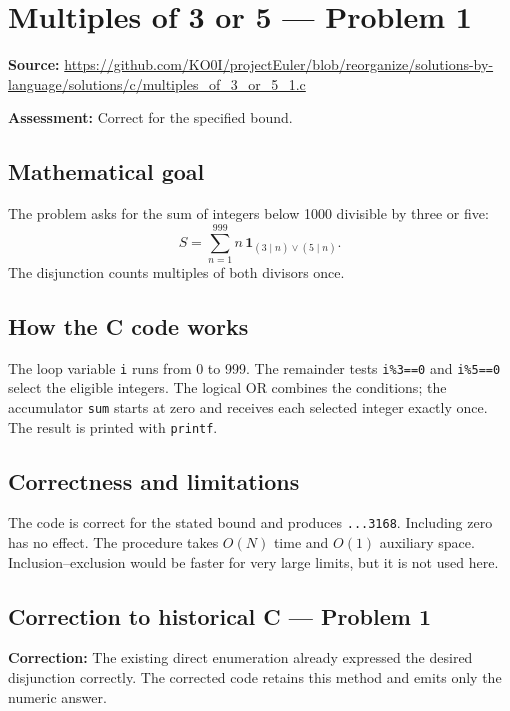 \section{Multiples of 3 or 5 --- Problem 1}
\label{prob:1}
\noindent\textbf{Source:} \url{https://github.com/KO0I/projectEuler/blob/reorganize/solutions-by-language/solutions/c/multiples_of_3_or_5_1.c}

\noindent\textbf{Assessment:} Correct for the specified bound.

\subsection*{Mathematical goal}
The problem asks for the sum of integers below 1000 divisible by three or five:
\[
S=\sum_{n=1}^{999} n\,\mathbf{1}_{(3\mid n)\lor(5\mid n)}.
\]
The disjunction counts multiples of both divisors once.

\subsection*{How the C code works}
The loop variable \verb|i| runs from 0 to 999. The remainder tests \verb|i%3==0| and \verb|i%5==0| select the eligible integers. The logical OR combines the conditions; the accumulator \verb|sum| starts at zero and receives each selected integer exactly once. The result is printed with \verb|printf|.

\subsection*{Correctness and limitations}
The code is correct for the stated bound and produces \texttt{...3168}. Including zero has no effect. The procedure takes \(O(N)\) time and \(O(1)\) auxiliary space. Inclusion--exclusion would be faster for very large limits, but it is not used here.


\subsection*{Correction to historical C --- Problem 1}
{\color{red}\textbf{Correction:} The existing direct enumeration already expressed the desired disjunction correctly. The corrected code retains this method and emits only the numeric answer.}
